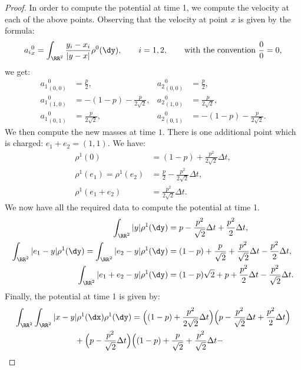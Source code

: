 \begin{proof}
In order to compute the potential at time 1, we compute the velocity at each of the above points. Observing that the velocity at point $x$ is given by the formula:
\begin{equation*}
{a_{i}}^0_{x} = \int_{\RR^2} \frac{y_{i} -x_{i} }{\vert y-x \vert}
\rho^0(\dy), \qquad i =1,2,
\qquad \text{with the convention} \ \frac{0}{0} = 0,
\end{equation*}
we get:
\begin{align*}
{a_{1}}^{0}_{(0,0)} &= \frac{p}{2}, & {a_{2}}^{0}_{(0,0)} &= \frac{p}{2},
\\
{a_{1}}^{0}_{(1,0)} &= - (1-p) - \frac{p}{2\sqrt{2}}, & {a_{2}}^{0}_{(1,0)} &= \frac{p}{2\sqrt{2}},
\\
{a_{1}}^{0}_{(0,1)} &= \frac{p}{2\sqrt{2}}, & {a_{2}}^{0}_{(0,1)} &= - (1-p) - \frac{p}{2\sqrt{2}}.
\end{align*}
We then compute the new masses at time $1$. There is one additional point which is charged: $e_{1}+e_{2}=(1,1)$. We have:
\begin{align*}
\rho^{1}(0) &= (1-p) + \frac{p^2}{2\sqrt{2}} \Delta t,
\\
\rho^{1}(e_{1}) = \rho^{1}(e_{2}) &= \frac{p}{2} - \frac{p^2}{2 \sqrt{2}} \Delta t,
\\
\rho^{1}(e_{1}+e_{2}) &= \frac{p^2}{2 \sqrt{2}} \Delta t.
\end{align*}
We now have all the required data to compute the potential at time 1.
\begin{align*}
\int_{\RR^2} \vert y \vert \rho^1(\dy) &= p - \frac{p^2}{\sqrt{2}} \Delta t + \frac{p^2}{2} \Delta t,
\\
\int_{\RR^2} \vert e_{1}- y \vert \rho^1(\dy) =
\int_{\RR^2} \vert e_{2}- y \vert \rho^1(\dy) &= (1-p) + \frac{p}{\sqrt{2}} +
\frac{p^2}{\sqrt{2}} \Delta t -
\frac{p^2}{2} \Delta t,
\\
\int_{\RR^2} \vert e_{1}+e_{2} - y \vert \rho^1(\dy) & = (1-p) \sqrt{2} + p + \frac{p^2}{2} \Delta t - \frac{p^2}{\sqrt{2}} \Delta t.
\end{align*}
Finally, the potential at time 1 is given by:
\begin{multline*}
\int_{\RR^2}\int_{\RR^2} \vert x- y \vert
\rho^{1}(\dx)
\rho^{1}(\dy)= \Bigl((1-p) + \frac{p^2}{2 \sqrt{2}} \Delta t
\Bigr)
\Bigl(p - \frac{p^2}{\sqrt{2}} \Delta t + \frac{p^2}{2} \Delta t \Bigr)
\\
\begin{aligned}
& +\Bigl(p - \frac{p^2}{\sqrt{2}} \Delta t
\Bigr)
\Bigl((1-p) + \frac{p}{\sqrt{2}} +
\frac{p^2}{\sqrt{2}} \Delta t -

\end{aligned}
\end{multline*}
\end{proof}
